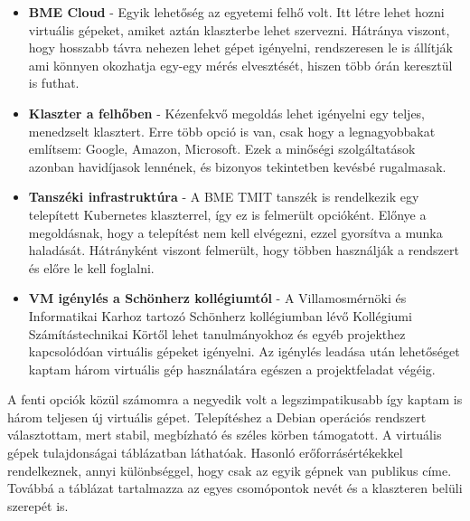 \begin{itemize}
 	\item \textbf{BME Cloud} - Egyik lehetőség az egyetemi felhő volt. 
 	Itt létre lehet hozni virtuális gépeket, amiket aztán klaszterbe lehet szervezni.
 	Hátránya viszont, hogy hosszabb távra nehezen lehet gépet igényelni, rendszeresen le is állítják ami könnyen okozhatja egy-egy mérés elvesztését, hiszen több órán keresztül is futhat.
	\item \textbf{Klaszter a felhőben} - Kézenfekvő megoldás lehet igényelni egy teljes, menedzselt klasztert. 
	Erre több opció is van, csak hogy a legnagyobbakat említsem: Google, Amazon, Microsoft.
	Ezek a minőségi szolgáltatások azonban havidíjasok lennének, és bizonyos tekintetben kevésbé rugalmasak. 
	 
    \item \textbf{Tanszéki infrastruktúra} - A BME TMIT tanszék is rendelkezik egy telepített Kubernetes klaszterrel, így ez is felmerült opcióként.
    Előnye a megoldásnak, hogy a telepítést nem kell elvégezni, ezzel gyorsítva a munka haladását.
    Hátrányként viszont felmerült, hogy többen használják a rendszert és előre le kell foglalni.

      \item \textbf{VM igénylés a Schönherz kollégiumtól} - A Villamosmérnöki és Informatikai Karhoz tartozó Schönherz kollégiumban lévő Kollégiumi Számítástechnikai Körtől lehet tanulmányokhoz és egyéb projekthez kapcsolódóan virtuális gépeket igényelni. 
      Az igénylés leadása után lehetőséget kaptam három virtuális gép használatára egészen a projektfeladat végéig.
      
\end{itemize}		

A fenti opciók közül számomra a negyedik volt a legszimpatikusabb így kaptam is három teljesen új virtuális gépet. Telepítéshez a Debian operációs rendszert választottam, mert stabil, megbízható és széles körben támogatott. A virtuális gépek tulajdonságai  táblázatban láthatóak. Hasonló erőforrásértékekkel rendelkeznek, annyi különbséggel, hogy csak az egyik gépnek van publikus címe. Továbbá a táblázat tartalmazza az egyes csomópontok nevét és a klaszteren belüli szerepét is.

